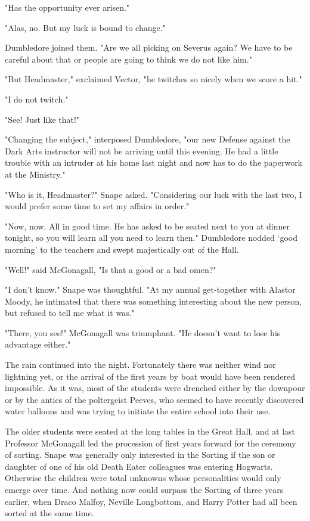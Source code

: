 "Has the opportunity ever arisen."

"Alas, no. But my luck is bound to change."

Dumbledore joined them. "Are we all picking on Severus again? We have to be careful about that or people are going to think we do not like him."

"But Headmaster," exclaimed Vector, "he twitches so nicely when we score a hit."

"I do not twitch."

"See! Just like that!"

"Changing the subject," interposed Dumbledore, "our new Defense against the Dark Arts instructor will not be arriving until this evening. He had a little trouble with an intruder at his home last night and now has to do the paperwork at the Ministry."

"Who is it, Headmaster?" Snape asked. "Considering our luck with the last two, I would prefer some time to set my affairs in order."

"Now, now. All in good time. He has asked to be seated next to you at dinner tonight, so you will learn all you need to learn then." Dumbledore nodded `good morning' to the teachers and swept majestically out of the Hall.

"Well!" said McGonagall, "Is that a good or a bad omen?"

"I don't know." Snape was thoughtful. "At my annual get-together with Alastor Moody, he intimated that there was something interesting about the new person, but refused to tell me what it was."

"There, you see!" McGonagall was triumphant. "He doesn't want to lose his advantage either."

The rain continued into the night. Fortunately there was neither wind nor lightning yet, or the arrival of the first years by boat would have been rendered impossible. As it was, most of the students were drenched either by the downpour or by the antics of the poltergeist Peeves, who seemed to have recently discovered water balloons and was trying to initiate the entire school into their use.

The older students were seated at the long tables in the Great Hall, and at last Professor McGonagall led the procession of first years forward for the ceremony of sorting. Snape was generally only interested in the Sorting if the son or daughter of one of his old Death Eater colleagues was entering Hogwarts. Otherwise the children were total unknowns whose personalities would only emerge over time. And nothing now could surpass the Sorting of three years earlier, when Draco Malfoy, Neville Longbottom, and Harry Potter had all been sorted at the same time.

